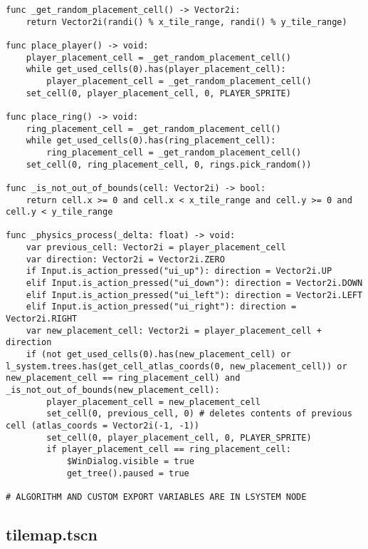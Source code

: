 \begin{lstlisting}
func _get_random_placement_cell() -> Vector2i:
	return Vector2i(randi() % x_tile_range, randi() % y_tile_range)

func place_player() -> void:
	player_placement_cell = _get_random_placement_cell()
	while get_used_cells(0).has(player_placement_cell):
		player_placement_cell = _get_random_placement_cell()
	set_cell(0, player_placement_cell, 0, PLAYER_SPRITE)

func place_ring() -> void:
	ring_placement_cell = _get_random_placement_cell()
	while get_used_cells(0).has(ring_placement_cell):
		ring_placement_cell = _get_random_placement_cell()
	set_cell(0, ring_placement_cell, 0, rings.pick_random())

func _is_not_out_of_bounds(cell: Vector2i) -> bool:
	return cell.x >= 0 and cell.x < x_tile_range and cell.y >= 0 and cell.y < y_tile_range

func _physics_process(_delta: float) -> void:
	var previous_cell: Vector2i = player_placement_cell
	var direction: Vector2i = Vector2i.ZERO
	if Input.is_action_pressed("ui_up"): direction = Vector2i.UP
	elif Input.is_action_pressed("ui_down"): direction = Vector2i.DOWN
	elif Input.is_action_pressed("ui_left"): direction = Vector2i.LEFT
	elif Input.is_action_pressed("ui_right"): direction = Vector2i.RIGHT
	var new_placement_cell: Vector2i = player_placement_cell + direction
	if (not get_used_cells(0).has(new_placement_cell) or l_system.trees.has(get_cell_atlas_coords(0, new_placement_cell)) or new_placement_cell == ring_placement_cell) and _is_not_out_of_bounds(new_placement_cell):
		player_placement_cell = new_placement_cell
		set_cell(0, previous_cell, 0) # deletes contents of previous cell (atlas_coords = Vector2i(-1, -1))
		set_cell(0, player_placement_cell, 0, PLAYER_SPRITE)
		if player_placement_cell == ring_placement_cell:
			$WinDialog.visible = true
			get_tree().paused = true

# ALGORITHM AND CUSTOM EXPORT VARIABLES ARE IN LSYSTEM NODE
\end{lstlisting}

\subsection{tile\textunderscore{}map.tscn}

